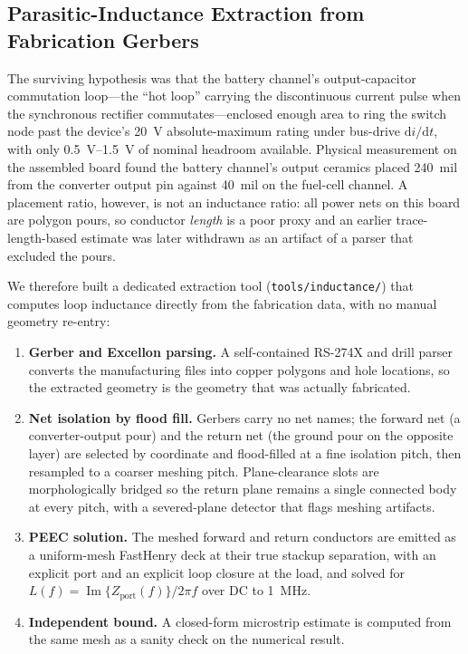 \subsection{Parasitic-Inductance Extraction from Fabrication Gerbers}
\label{sec:bringup:inductance}


The surviving hypothesis was that the battery channel's output-capacitor
commutation loop---the ``hot loop'' carrying the discontinuous current pulse when
the synchronous rectifier commutates---enclosed enough area to ring the switch node
past the device's \SI{20}{\volt} absolute-maximum rating under bus-drive
$\mathrm{d}i/\mathrm{d}t$, with only \SIrange{0.5}{1.5}{\volt} of nominal headroom
available. Physical measurement on the assembled board found the battery channel's
output ceramics placed \SI{240}{mil} from the converter output pin against
\SI{40}{mil} on the fuel-cell channel. A placement ratio, however, is not an
inductance ratio: all power nets on this board are polygon pours, so conductor
\emph{length} is a poor proxy and an earlier trace-length-based estimate was later
withdrawn as an artifact of a parser that excluded the pours.

We therefore built a dedicated extraction tool
(\texttt{tools/inductance/}) that computes loop inductance directly from the
fabrication data, with no manual geometry re-entry:

\begin{enumerate}
\item \textbf{Gerber and Excellon parsing.} A self-contained RS-274X and drill
parser converts the manufacturing files into copper polygons and hole locations,
so the extracted geometry is the geometry that was actually fabricated.
\item \textbf{Net isolation by flood fill.} Gerbers carry no net names; the forward
net (a converter-output pour) and the return net (the ground pour on the opposite
layer) are selected by coordinate and flood-filled at a fine isolation pitch, then
resampled to a coarser meshing pitch. Plane-clearance slots are morphologically
bridged so the return plane remains a single connected body at every pitch, with a
severed-plane detector that flags meshing artifacts.
\item \textbf{PEEC solution.} The meshed forward and return conductors are emitted
as a uniform-mesh FastHenry deck at their true stackup separation, with an explicit
port and an explicit loop closure at the load, and solved for
$L(f) = \operatorname{Im}\{Z_\mathrm{port}(f)\}/2\pi f$ over DC to \SI{1}{\mega\hertz}.
\item \textbf{Independent bound.} A closed-form microstrip estimate is computed from
the same mesh as a sanity check on the numerical result.
\end{enumerate}

